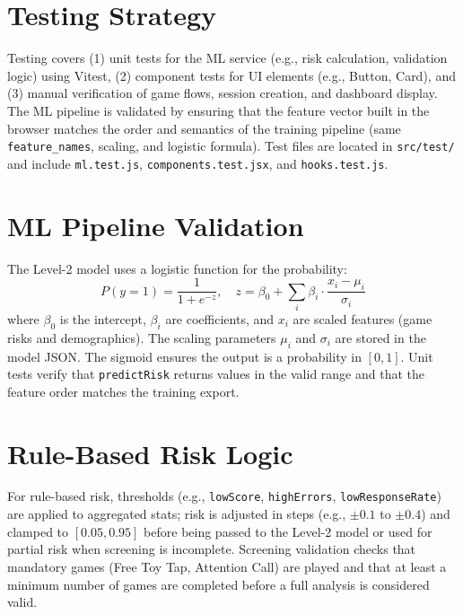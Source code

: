 \documentclass[12pt,a4paper]{report}
\begin{document}
\section{Testing Strategy}
Testing covers (1) unit tests for the ML service (e.g., risk calculation, validation logic) using Vitest, (2) component tests for UI elements (e.g., Button, Card), and (3) manual verification of game flows, session creation, and dashboard display. The ML pipeline is validated by ensuring that the feature vector built in the browser matches the order and semantics of the training pipeline (same \texttt{feature\_names}, scaling, and logistic formula). Test files are located in \texttt{src/test/} and include \texttt{ml.test.js}, \texttt{components.test.jsx}, and \texttt{hooks.test.js}.
\section{ML Pipeline Validation}
The Level-2 model uses a logistic function for the probability:
\begin{equation}
P(y=1) = \frac{1}{1 + e^{-z}}, \quad z = \beta_0 + \sum_{i} \beta_i \cdot \frac{x_i - \mu_i}{\sigma_i}
\end{equation}
where \(\beta_0\) is the intercept, \(\beta_i\) are coefficients, and \(x_i\) are scaled features (game risks and demographics). The scaling parameters \(\mu_i\) and \(\sigma_i\) are stored in the model JSON. The sigmoid ensures the output is a probability in \([0,1]\). Unit tests verify that \texttt{predictRisk} returns values in the valid range and that the feature order matches the training export.
\section{Rule-Based Risk Logic}
For rule-based risk, thresholds (e.g., \texttt{lowScore}, \texttt{highErrors}, \texttt{lowResponseRate}) are applied to aggregated stats; risk is adjusted in steps (e.g., \(\pm 0.1\) to \(\pm 0.4\)) and clamped to \([0.05, 0.95]\) before being passed to the Level-2 model or used for partial risk when screening is incomplete. Screening validation checks that mandatory games (Free Toy Tap, Attention Call) are played and that at least a minimum number of games are completed before a full analysis is considered valid.
\end{document}
